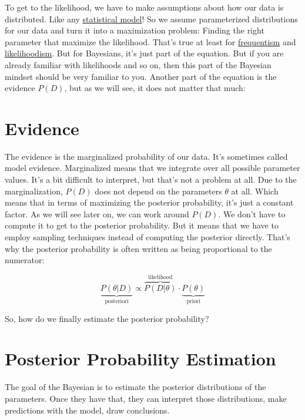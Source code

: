 \documentclass[
  10pt,
]{scrbook}
\begin{document}
To get to the likelihood, we have to make assumptions about how our data is distributed.
Like any \protect\hyperlink{statistical-modeling}{statistical model}!
So we assume parameterized distributions for our data and turn it into a maximization problem: Finding the right parameter that maximize the likelihood.
That's true at least for \protect\hyperlink{frequentism}{frequentism} and \protect\hyperlink{likelihoodism}{likelihoodism}.
But for Bayesians, it's just part of the equation.
But if you are already familiar with likelihoods and so on, then this part of the Bayesian mindset should be very familiar to you.
Another part of the equation is the evidence \(P(D)\), but as we will see, it does not matter that much:

\hypertarget{evidence}{%
\section{Evidence}\label{evidence}}

The evidence is the marginalized probability of our data.
It's sometimes called model evidence.
Marginalized means that we integrate over all possible parameter values.
It's a bit difficult to interpret, but that's not a problem at all.
Due to the marginalization, \(P(D)\) does not depend on the parameters \(\theta\) at all.
Which means that in terms of maximizing the posterior probability, it's just a constant factor.
As we will see later on, we can work around \(P(D)\).
We don't have to compute it to get to the posterior probability.
But it means that we have to employ sampling techniques instead of computing the posterior directly.
That's why the posterior probability is often written as being proportional to the numerator:

\[\underbrace{P(\theta|D)}_{\text{posteriori}} \propto \overbrace{P(D | \theta)}^{\text{likelihood}} \cdot  \underbrace{P(\theta)}_{\text{priori}}\]

So, how do we finally estimate the posterior probability?

\hypertarget{posterior-probability-estimation}{%
\section{Posterior Probability Estimation}\label{posterior-probability-estimation}}

The goal of the Bayesian is to estimate the posterior distributions of the parameters.
Once they have that, they can interpret those distributions, make predictions with the model, draw conclusions.
\end{document}
